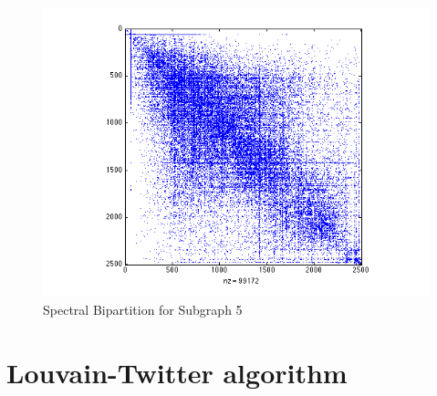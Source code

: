 \documentclass[11pt]{article}
\begin{document}
		 \begin{figure}[t]
		 		\begin{center}
		  		\includegraphics[width=1\linewidth]{spectral_partition_a5.png}
		  	\end{center}
		  	\vspace{-20pt}
		  	\caption{Spectral Bipartition for Subgraph 5}
		  	\label{fig:sb5}
		 \end{figure}
		  

\section{Louvain-Twitter algorithm}

     
\end{document}
